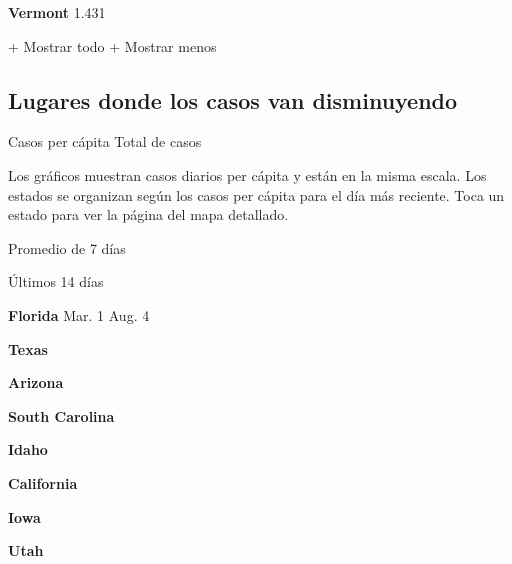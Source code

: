 \href{https://www.nytimes.com/interactive/2020/us/vermont-coronavirus-cases.html}{}

\textbf{Vermont} 1.431

+ Mostrar todo + Mostrar menos

\hypertarget{lugares-donde-los-casos-van-disminuyendo}{%
\subsection{Lugares donde los casos van
disminuyendo}\label{lugares-donde-los-casos-van-disminuyendo}}

Casos per cápita Total de casos

Los gráficos muestran casos diarios per cápita y están en la misma
escala. Los estados se organizan según los casos per cápita para el día
más reciente. Toca un estado para ver la página del mapa detallado.

\href{https://www.nytimes.com/interactive/2020/us/florida-coronavirus-cases.html}{}

Promedio de 7 días

Últimos 14 días

\textbf{Florida} Mar. 1 Aug. 4

\href{https://www.nytimes.com/interactive/2020/us/texas-coronavirus-cases.html}{}

\textbf{Texas}

\href{https://www.nytimes.com/interactive/2020/us/arizona-coronavirus-cases.html}{}

\textbf{Arizona}

\href{https://www.nytimes.com/interactive/2020/us/south-carolina-coronavirus-cases.html}{}

\textbf{South Carolina}

\href{https://www.nytimes.com/interactive/2020/us/idaho-coronavirus-cases.html}{}

\textbf{Idaho}

\href{https://www.nytimes.com/interactive/2020/us/california-coronavirus-cases.html}{}

\textbf{California}

\href{https://www.nytimes.com/interactive/2020/us/iowa-coronavirus-cases.html}{}

\textbf{Iowa}

\href{https://www.nytimes.com/interactive/2020/us/utah-coronavirus-cases.html}{}

\textbf{Utah}

\href{https://www.nytimes.com/interactive/2020/us/kansas-coronavirus-cases.html}{}

